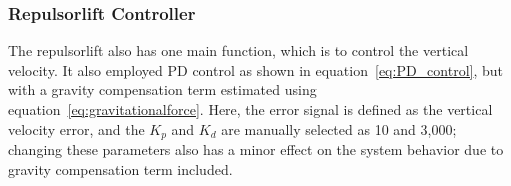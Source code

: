 \subsubsection{Repulsorlift Controller}
\label{sec:repulsorlift_control}
The repulsorlift also has one main function, which is to control the vertical velocity. It also employed PD control as shown in equation~\ref{eq:PD_control}, but with a gravity compensation term estimated using equation~\ref{eq:gravitationalforce}. Here, the error signal is defined as the vertical velocity error, and the $K_p$ and $K_d$ are manually selected as 10 and 3,000; changing these parameters also has a minor effect on the system behavior due to gravity compensation term included.